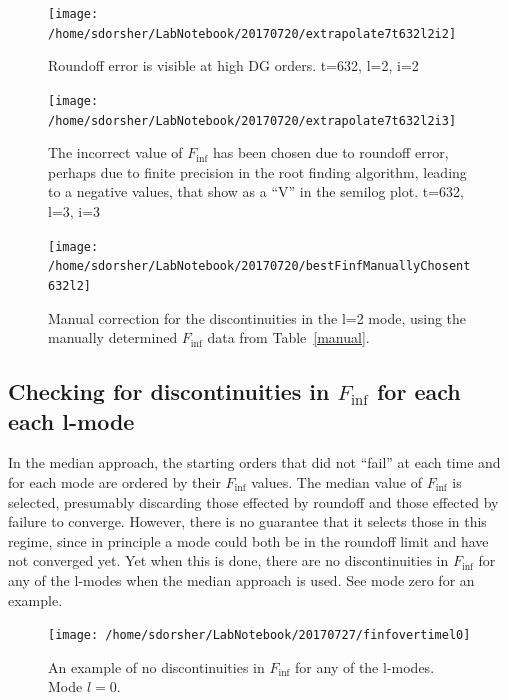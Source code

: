 \begin{figure}
  \texttt{[image: /home/sdorsher/LabNotebook/20170720/extrapolate7t632l2i2]}
  \caption{Roundoff error is visible at high DG orders. t=632, l=2, i=2}
\end{figure}

\begin{figure}
  \texttt{[image: /home/sdorsher/LabNotebook/20170720/extrapolate7t632l2i3]}
  \caption{The incorrect value of $F_{\inf}$ has been chosen due to roundoff error, perhaps due to finite precision in the root finding algorithm, leading to a negative values, that show as a ``V'' in the semilog plot. t=632, l=3, i=3}
\end{figure}


\begin{figure}
  \texttt{[image: /home/sdorsher/LabNotebook/20170720/bestFinfManuallyChosent632l2]}
\caption{Manual correction for the discontinuities in the l=2 mode, using the manually determined $F_{\inf}$ data from Table~\ref{manual}. }
\end{figure}

\subsection{ Checking for discontinuities in $F_{\inf}$ for each each l-mode}

In the median approach, the starting orders that did not ``fail'' at each time and for each mode are ordered by their $F_{\inf}$ values. The median value of $F_{\inf}$ is selected, presumably discarding those effected by roundoff and those effected by failure to converge. However, there is no guarantee that it selects those in this regime, since in principle a mode could both be in the roundoff limit and have not converged yet. Yet when this is done, there are no discontinuities in $F_{\inf}$ for any of the l-modes when the median approach is used. See mode zero for an example.

\begin{figure}
  \texttt{[image: /home/sdorsher/LabNotebook/20170727/finfovertimel0]}
  \caption{An example of no discontinuities in $F_{\inf}$ for any of the l-modes. Mode $l=0$.}
\end{figure}


